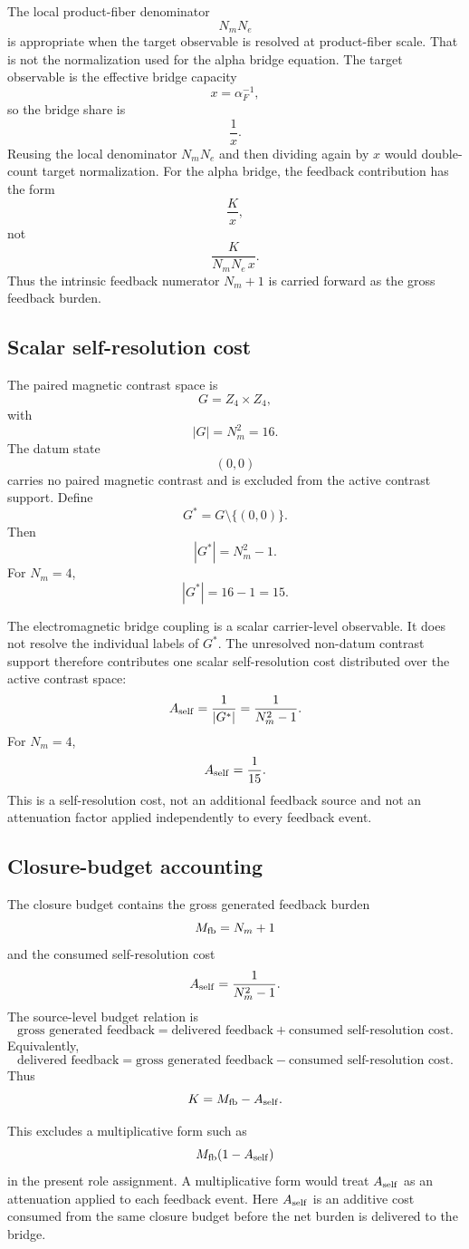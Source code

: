 The local product-fiber denominator
\[
N_mN_e
\]
is appropriate when the target observable is resolved at product-fiber
scale. That is not the normalization used for the alpha bridge equation.
The target observable is the effective bridge capacity
\[
x=\alpha_F^{-1},
\]
so the bridge share is
\[
\frac1x.
\]
Reusing the local denominator \(N_mN_e\) and then dividing again by
\(x\) would double-count target normalization. For the alpha bridge, the
feedback contribution has the form
\[
\frac{K}{x},
\]
not
\[
\frac{K}{N_mN_e\,x}.
\]
Thus the intrinsic feedback numerator \(N_m+1\) is carried forward as
the gross feedback burden.

\subsection{Scalar self-resolution cost}

The paired magnetic contrast space is
\[
G=Z_4\times Z_4,
\]
with
\[
|G|=N_m^2=16.
\]
The datum state
\[
(0,0)
\]
carries no paired magnetic contrast and is excluded from the active
contrast support. Define
\[
G^\ast=G\setminus\{(0,0)\}.
\]
Then
\[
|G^\ast|=N_m^2-1.
\]
For \(N_m=4\),
\[
|G^\ast|=16-1=15.
\]

The electromagnetic bridge coupling is a scalar carrier-level observable.
It does not resolve the individual labels of \(G^\ast\). The unresolved
non-datum contrast support therefore contributes one scalar
self-resolution cost distributed over the active contrast space:
\[
A_{\rm self}
=
\frac1{|G^\ast|}
=
\frac1{N_m^2-1}.
\]
For \(N_m=4\),
\[
A_{\rm self}
=
\frac1{15}.
\]
This is a self-resolution cost, not an additional feedback source and
not an attenuation factor applied independently to every feedback event.

\subsection{Closure-budget accounting}

The closure budget contains the gross generated feedback burden
\[
M_{\rm fb}=N_m+1
\]
and the consumed self-resolution cost
\[
A_{\rm self}=\frac1{N_m^2-1}.
\]
The source-level budget relation is
\[
\text{gross generated feedback}
=
\text{delivered feedback}
+
\text{consumed self-resolution cost}.
\]
Equivalently,
\[
\text{delivered feedback}
=
\text{gross generated feedback}
-
\text{consumed self-resolution cost}.
\]
Thus
\[
K=M_{\rm fb}-A_{\rm self}.
\]

This excludes a multiplicative form such as
\[
M_{\rm fb}(1-A_{\rm self})
\]
in the present role assignment. A multiplicative form would treat
\(A_{\rm self}\) as an attenuation applied to each feedback event. Here
\(A_{\rm self}\) is an additive cost consumed from the same closure
budget before the net burden is delivered to the bridge.

